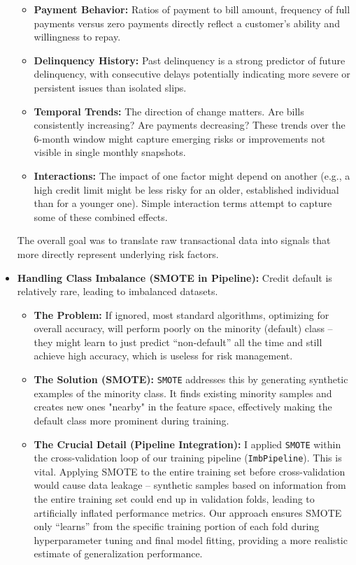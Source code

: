 \documentclass[a4paper,12pt]{article}
\begin{document}
\begin{itemize}
\begin{itemize}
    \item \textbf{Payment Behavior:} Ratios of payment to bill amount, frequency of full payments versus zero payments directly reflect a customer's ability and willingness to repay.
    
    \item \textbf{Delinquency History:} Past delinquency is a strong predictor of future delinquency, with consecutive delays potentially indicating more severe or persistent issues than isolated slips.
    
    \item \textbf{Temporal Trends:} The direction of change matters. Are bills consistently increasing? Are payments decreasing? These trends over the 6-month window might capture emerging risks or improvements not visible in single monthly snapshots.
    
    \item \textbf{Interactions:} The impact of one factor might depend on another (e.g., a high credit limit might be less risky for an older, established individual than for a younger one). Simple interaction terms attempt to capture some of these combined effects.
  \end{itemize}
  The overall goal was to translate raw transactional data into signals that more directly represent underlying risk factors.

  \item \textbf{Handling Class Imbalance (SMOTE in Pipeline):} Credit default is relatively rare, leading to imbalanced datasets.
  \begin{itemize}
    \item \textbf{The Problem:} If ignored, most standard algorithms, optimizing for overall accuracy, will perform poorly on the minority (default) class – they might learn to just predict ``non-default'' all the time and still achieve high accuracy, which is useless for risk management.
    
    \item \textbf{The Solution (SMOTE):} \texttt{SMOTE} addresses this by generating synthetic examples of the minority class. It finds existing minority samples and creates new ones "nearby" in the feature space, effectively making the default class more prominent during training.
    
    \item \textbf{The Crucial Detail (Pipeline Integration):} I applied \texttt{SMOTE} within the cross-validation loop of our training pipeline (\texttt{ImbPipeline}). This is vital. Applying SMOTE to the entire training set before cross-validation would cause data leakage – synthetic samples based on information from the entire training set could end up in validation folds, leading to artificially inflated performance metrics. Our approach ensures SMOTE only ``learns'' from the specific training portion of each fold during hyperparameter tuning and final model fitting, providing a more realistic estimate of generalization performance.
  \end{itemize}


\end{itemize}
\end{document}
